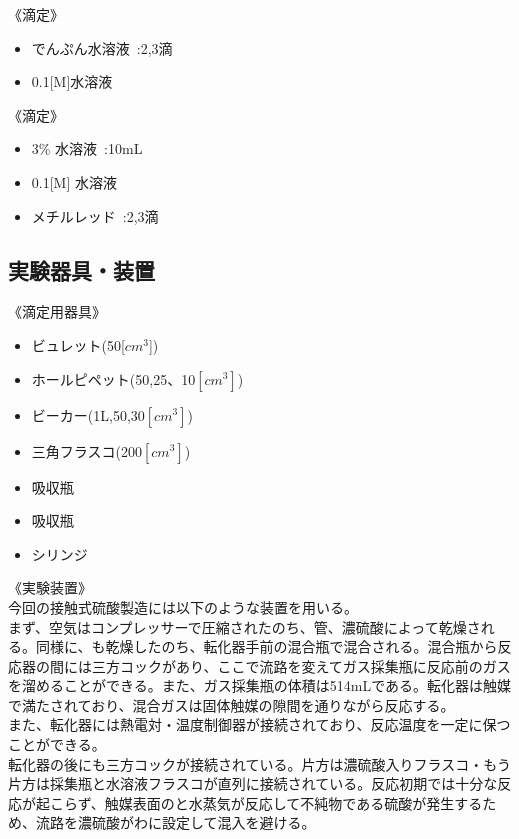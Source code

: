 \documentclass{ltjsarticle}
\begin{document}
《滴定》

\begin{itemize}
    \item でんぷん水溶液\ :2,3滴
    \item 0.1[M]水溶液
\end{itemize}

《滴定》

\begin{itemize}
    \item 3\% 水溶液\ :10mL
    \item 0.1[M] 水溶液
    \item メチルレッド\ :2,3滴
\end{itemize}

\subsection{実験器具・装置}

《滴定用器具》

\begin{itemize}
    \item ビュレット(50[$cm^3$])
    \item ホールピペット(50,25、10$[cm^3]$)
    \item ビーカー(1L,50,30$[cm^3]$)
    \item 三角フラスコ(200$[cm^3]$)
    \item {}吸収瓶
    \item {}吸収瓶
    \item シリンジ
\end{itemize}

《実験装置》\\

今回の接触式硫酸製造には以下のような装置を用いる。\\
まず、空気はコンプレッサーで圧縮されたのち、管、濃硫酸によって乾燥される。同様に、も乾燥したのち、転化器手前の混合瓶で混合される。混合瓶から反応器の間には三方コックがあり、ここで流路を変えてガス採集瓶に反応前のガスを溜めることができる。また、ガス採集瓶の体積は514mLである。転化器は触媒で満たされており、混合ガスは固体触媒の隙間を通りながら反応する。\\
また、転化器には熱電対・温度制御器が接続されており、反応温度を一定に保つことができる。\\
転化器の後にも三方コックが接続されている。片方は濃硫酸入りフラスコ・もう片方は採集瓶と水溶液フラスコが直列に接続されている。反応初期では十分な反応が起こらず、触媒表面のと水蒸気が反応して不純物である硫酸が発生するため、流路を濃硫酸がわに設定して混入を避ける。\\
\end{document}
